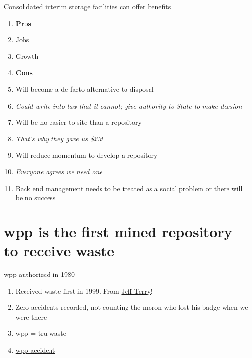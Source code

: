 \documentclass[aspectratio=1610,pdftex,dvipsnames,compress,xcolor={dvipsnames}]{beamer}
\newcommand{\acs}{\acrshort} %
\begin{document}
\begin{frame}{Consolidated interim storage facilities can offer benefits}
    \begin{enumerate}[series=outerlist,topsep=0pt,itemsep=5pt,leftmargin=*,label=(\arabic*)]
        \item[]\textbf{Pros}
        \item[]Jobs
        \item[]Growth
            \vspace{0.15in}
        \item[]\textbf{Cons}
        \item[]Will become a de facto alternative to disposal
        \item[]\textit{Could write into law that it cannot; give authority to State to make decsion}
        \item[]Will be no easier to site than a repository
        \item[]\textit{That's why they gave us \$2M}
        \item[]Will reduce momentum to develop a repository
        \item[]\textit{Everyone agrees we need one}
            \vspace{0.20in}
        \item[]Back end management needs to be treated as a social problem or there will be no success
    \end{enumerate}
\end{frame}


\section{\acs{wpp} is the first mined repository to receive waste}


\addtocounter{framenumber}{-1} 
\begin{frame}{\acs{wpp} authorized in 1980}
    \begin{enumerate}[topsep=0pt,itemsep=21pt,leftmargin=*,label=(\arabic*)]
        \item[]Received waste first in 1999. From \href{https://twitter.com/nuclear94}{Jeff Terry}!
        \item[]Zero accidents recorded, not counting the moron who lost his badge when we were there
        \item[]\acs{wpp} = \acs{tru} waste
        \item[]\href{https://uidaho.pressbooks.pub/nuclearengineering/chapter/doe-waste-disposal-facilities/}{\acs{wpp} accident}
    \end{enumerate}
\end{frame}
\end{document}
